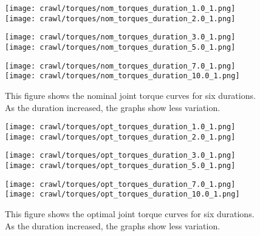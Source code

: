 \begin{figure}
\centering
\texttt{[image: crawl/torques/nom\_torques\_duration\_1.0\_1.png]}
\texttt{[image: crawl/torques/nom\_torques\_duration\_2.0\_1.png]}

\centering
\texttt{[image: crawl/torques/nom\_torques\_duration\_3.0\_1.png]}
\texttt{[image: crawl/torques/nom\_torques\_duration\_5.0\_1.png]}

\centering
\texttt{[image: crawl/torques/nom\_torques\_duration\_7.0\_1.png]}
\texttt{[image: crawl/torques/nom\_torques\_duration\_10.0\_1.png]}

\caption{This figure shows the nominal joint torque curves for six durations.
         As the duration increased, the graphs show less variation.}
\label{fig:vrep_nom_joint_torques_by_duration1}
\end{figure}

\begin{figure}
\centering
\texttt{[image: crawl/torques/opt\_torques\_duration\_1.0\_1.png]}
\texttt{[image: crawl/torques/opt\_torques\_duration\_2.0\_1.png]}

\centering
\texttt{[image: crawl/torques/opt\_torques\_duration\_3.0\_1.png]}
\texttt{[image: crawl/torques/opt\_torques\_duration\_5.0\_1.png]}

\centering
\texttt{[image: crawl/torques/opt\_torques\_duration\_7.0\_1.png]}
\texttt{[image: crawl/torques/opt\_torques\_duration\_10.0\_1.png]}

\caption{This figure shows the optimal joint torque curves for six durations.
         As the duration increased, the graphs show less variation.}
\label{fig:vrep_opt_joint_torques_by_duration1}
\end{figure}

